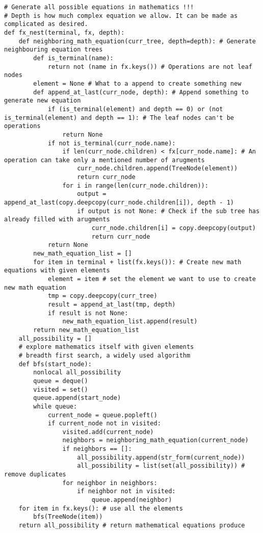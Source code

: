 \documentclass{book}
\begin{document}
\begin{lstlisting}[style=mystyle, caption={main.py}, label={lst:python_code}]
# Generate all possible equations in mathematics !!!
# Depth is how much complex equation we allow. It can be made as complicated as desired.
def fx_nest(terminal, fx, depth):
    def neighboring_math_equation(curr_tree, depth=depth): # Generate neighbouring equation trees
        def is_terminal(name):
            return not (name in fx.keys()) # Operations are not leaf nodes
        element = None # What to a append to create something new
        def append_at_last(curr_node, depth): # Append something to generate new equation
            if (is_terminal(element) and depth == 0) or (not is_terminal(element) and depth == 1): # The leaf nodes can't be operations
                return None
            if not is_terminal(curr_node.name):
                if len(curr_node.children) < fx[curr_node.name]: # An operation can take only a mentioned number of arugments
                    curr_node.children.append(TreeNode(element))
                    return curr_node
                for i in range(len(curr_node.children)):
                    output = append_at_last(copy.deepcopy(curr_node.children[i]), depth - 1)
                    if output is not None: # Check if the sub tree has already filled with arugments
                        curr_node.children[i] = copy.deepcopy(output)
                        return curr_node
            return None
        new_math_equation_list = []
        for item in terminal + list(fx.keys()): # Create new math equations with given elements
            element = item # set the element we want to use to create new math equation
            tmp = copy.deepcopy(curr_tree)
            result = append_at_last(tmp, depth)
            if result is not None:
                new_math_equation_list.append(result)
        return new_math_equation_list
    all_possibility = []
    # explore mathematics itself with given elements
    # breadth first search, a widely used algorithm
    def bfs(start_node):
        nonlocal all_possibility
        queue = deque()
        visited = set()
        queue.append(start_node)
        while queue:
            current_node = queue.popleft()
            if current_node not in visited:
                visited.add(current_node)
                neighbors = neighboring_math_equation(current_node)
                if neighbors == []:
                    all_possibility.append(str_form(current_node))
                    all_possibility = list(set(all_possibility)) # remove duplicates
                for neighbor in neighbors:
                    if neighbor not in visited:
                        queue.append(neighbor)
    for item in fx.keys(): # use all the elements
        bfs(TreeNode(item))
    return all_possibility # return mathematical equations produce


\end{lstlisting}
\end{document}

